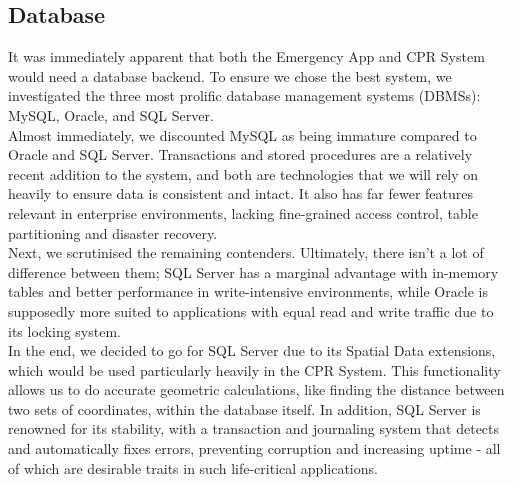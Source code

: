 \documentclass{article}
\begin{document}
	\subsection{Database}
	It was immediately apparent that both the Emergency App and CPR System would need a database backend. To ensure we chose the best system, we investigated the three most prolific database management systems (DBMSs): MySQL, Oracle, and SQL Server.\\

Almost immediately, we discounted MySQL as being immature compared to Oracle and SQL Server. Transactions and stored procedures are a relatively recent addition to the system, and both are technologies that we will rely on heavily to ensure data is consistent and intact. It also has far fewer features relevant in enterprise environments, lacking fine-grained access control, table partitioning and disaster recovery.\\

Next, we scrutinised the remaining contenders. Ultimately, there isn’t a lot of difference between them; SQL Server has a marginal advantage with in-memory tables and better performance in write-intensive environments, while Oracle is supposedly more suited to applications with equal read and write traffic due to its locking system.\\

In the end, we decided to go for SQL Server due to its Spatial Data extensions, which would be used particularly heavily in the CPR System. This functionality allows us to do accurate geometric calculations, like finding the distance between two sets of coordinates, within the database itself. In addition, SQL Server is renowned for its stability, with a transaction and journaling system that detects and automatically fixes errors, preventing corruption and increasing uptime - all of which are desirable traits in such life-critical applications.\\
	
\end{document}
